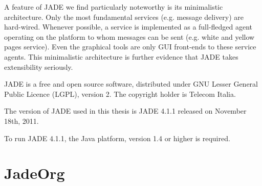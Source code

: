 A feature of JADE we find particularly noteworthy is its minimalistic architecture.
Only the most fundamental services (e.g. message delivery) are hard-wired.
Whenever possible, a service is implemented as a full-fledged agent operating on the platform to whom messages can be sent (e.g. white and yellow pages service).
Even the graphical tools are only GUI front-ends to these service agents.
This minimalistic architecture is further evidence that JADE takes extensibility seriously.

JADE is a free and open source software, distributed under GNU Lesser General Public Licence (LGPL), version 2.
The copyright holder is Telecom Italia.

The version of JADE used in this thesis is JADE 4.1.1 released on November 18th, 2011.

To run JADE 4.1.1, the Java platform, version 1.4 or higher is required.

\section{JadeOrg}